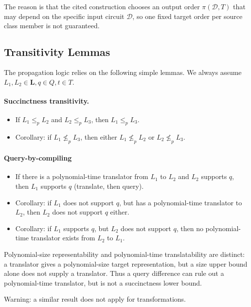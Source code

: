\documentclass[10pt]{article}
\theoremstyle{plain}
\theoremstyle{definition}
\theoremstyle{remark}
\begin{document}
The reason is that the cited construction chooses an output order $\pi(\mathcal{D},T)$ that may depend
on the specific input circuit $\mathcal{D}$, so one fixed target order per source class member is not guaranteed.



\subsection{Transitivity Lemmas}

The propagation logic relies on the following simple lemmas. We always assume $L_1,L_2 \in \textbf{L}, q \in Q, t \in T$.

\paragraph{Succinctness transitivity.}
\begin{itemize}
  \item{If $L_1 \leq_p L_2$ and $L_2 \leq_p L_3$, then $L_1 \leq_p L_3$.}
  \item{Corollary: if $L_1 \not\leq_p L_3$, then either $L_1 \not\leq_p L_2$ or $L_2 \not\leq_p L_3$.}
\end{itemize}
 
\paragraph{Query-by-compiling}
\begin{itemize}
\item{If there is a polynomial-time translator from $L_1$ to $L_2$ and $L_2$ supports $q$, then $L_1$ supports $q$ (translate, then query).}
\item{Corollary: if $L_1$ does not support $q$, but has a polynomial-time translator to $L_2$, then $L_2$ does not support $q$ either.}
\item{Corollary: if $L_1$ supports $q$, but $L_2$ does not support $q$, then no polynomial-time translator exists from $L_2$ to $L_1$.}
\end{itemize}

Polynomial-size representability and polynomial-time translatability are distinct: a translator gives a polynomial-size target representation, but a size upper bound alone does not supply a translator. Thus a query difference can rule out a polynomial-time translator, but is not a succinctness lower bound.

Warning: a similar result does not apply for transformations.
\end{document}

